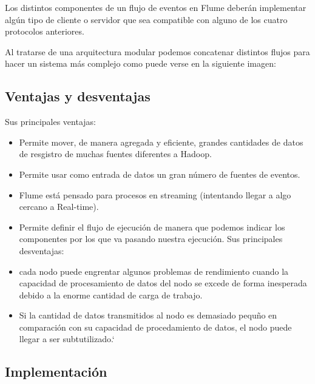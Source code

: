 \documentclass[]{article}
\begin{document}
Los distintos componentes de un flujo de eventos en Flume deberán
implementar algún tipo de cliente o servidor que sea compatible con
alguno de los cuatro protocolos anteriores.

Al tratarse de una arquitectura modular podemos concatenar distintos
flujos para hacer un sistema más complejo como puede verse en la
siguiente imagen:

\subsection{Ventajas y desventajas}\label{ventajas-y-desventajas}

Sus principales ventajas:

\begin{itemize}
\itemsep1pt\parskip0pt
\item
  Permite mover, de manera agregada y eficiente, grandes cantidades de
  datos de resgistro de muchas fuentes diferentes a Hadoop.
\item
  Permite usar como entrada de datos un gran número de fuentes de
  eventos.
\item
  Flume está pensado para procesos en streaming (intentando llegar a
  algo cercano a Real-time).
\item
  Permite definir el flujo de ejecución de manera que podemos indicar
  los componentes por los que va pasando nuestra ejecución. Sus
  principales desventajas:
\item
  cada nodo puede engrentar algunos problemas de rendimiento cuando la
  capacidad de procesamiento de datos del nodo se excede de forma
  inesperada debido a la enorme cantidad de carga de trabajo.
\item
  Si la cantidad de datos transmitidos al nodo es demasiado pequño en
  comparación con su capacidad de procedamiento de datos, el nodo puede
  llegar a ser subtutilizado.`
\end{itemize}

\subsection{Implementación}\label{implementacion-1}
\end{document}
